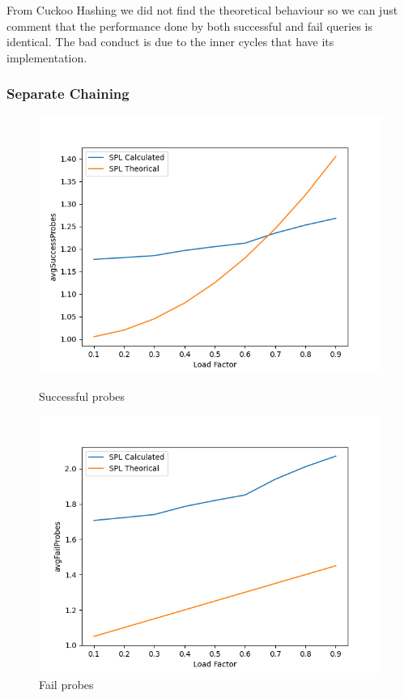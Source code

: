 \documentclass{article}
\begin{document}
    From Cuckoo Hashing we did not find the theoretical behaviour so we can just comment that the performance done by both successful and fail queries is identical. The bad conduct is due to the inner cycles that have its implementation.
    
    \subsubsection*{Separate Chaining}

        \begin{figure}[!h]
          \includegraphics[width=\linewidth]{images/loadFactor_vs_avgSuccessProbes_SPL.png}
          \caption{Successful probes}\label{fig:plot12}
        \endminipage\hfill
          \includegraphics[width=\linewidth]{images/loadFactor_vs_avgFailProbes_SPL.png}
          \caption{Fail probes}\label{fig:plot13}
        \endminipage
    \end{figure}
\end{document}
